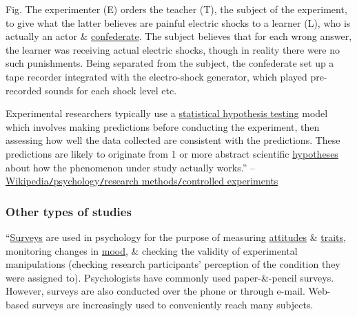 \documentclass[oneside]{book}
\numberwithin{equation}{section}
\begin{document}
\textsf{Fig. The experimenter (E) orders the teacher (T), the subject of the experiment, to give what the latter believes are painful electric shocks to a learner (L), who is actually an actor \& \href{https://en.wiktionary.org/wiki/confederate}{confederate}. The subject believes that for each wrong answer, the learner was receiving actual electric shocks, though in reality there were no such punishments. Being separated from the subject, the confederate set up a tape recorder integrated with the electro-shock generator, which played pre-recorded sounds for each shock level etc.}

Experimental researchers typically use a \href{https://en.wikipedia.org/wiki/Statistical_hypothesis_testing}{statistical hypothesis testing} model which involves making predictions before conducting the experiment, then assessing how well the data collected are consistent with the predictions. These predictions are likely to originate from 1 or more abstract scientific \href{https://en.wikipedia.org/wiki/Hypotheses}{hypotheses} about how the phenomenon under study actually works.'' -- \href{https://en.wikipedia.org/wiki/Psychology#Controlled_experiments}{Wikipedia\texttt{/}psychology\texttt{/}research methods\texttt{/}controlled experiments}

\subsubsection{Other types of studies}
``\href{https://en.wikipedia.org/wiki/Survey_methodology}{Surveys} are used in psychology for the purpose of measuring \href{https://en.wikipedia.org/wiki/Attitude_(psychology)}{attitudes} \& \href{https://en.wikipedia.org/wiki/Trait_theory}{traits}, monitoring changes in \href{https://en.wikipedia.org/wiki/Mood_(psychology)}{mood}, \& checking the validity of experimental manipulations (checking research participants' perception of the condition they were assigned to). Psychologists have commonly used paper-\&-pencil surveys. However, surveys are also conducted over the phone or through e-mail. Web-based surveys are increasingly used to conveniently reach many subjects.
\end{document}
